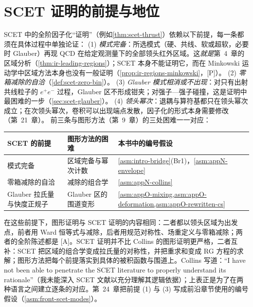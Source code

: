 \section{SCET 证明的前提与地位}\label{sec:scet-status}

\begin{remark}\label{rem:scet-assumptions}
SCET 中的全阶因子化“证明”（例如\cref{thm:scet-thrust}）依赖以下前提，每一条都须在具体过程中单独论证：
(1) \emph{模式完备}：所选模式（硬、共线、软或超软，必要时 Glauber）再现 QCD 在给定观测量下的全部领头红外区域。这\emph{就是}第~4~章的区域分析（\cref{thm:ir-leading-regions}）；SCET 本身不能证明它，而在 Minkowski 运动学中区域方法本身也没有一般证明（\cref{prop:ir-regions-minkowski}，[P]）。
(2) \emph{零箱减除的自洽}（\cref{def:scet-zero-bin}）。
(3) \emph{Glauber 模式相消或不出现}：对只有出射共线粒子的 $e^+e^-$ 过程，Glauber 区不形成钳夹；对强子—强子碰撞，这是证明中最困难的一步（\cref{sec:scet-glauber}）。
(4) \emph{领头幂次}：退耦与算符基都只在领头幂次成立；在次领头幂次，卷积可以出现端点发散，因子化的形式本身需要修改（第~21~章）。
前三条与图形方法（第~9~章）的三处困难一一对应：
\begin{center}\small
\renewcommand{\arraystretch}{1.1}
\begin{tabular}{@{}lll@{}}
\toprule
SCET 的前提 & 图形方法的困难 & 本书中的编号假设 \\
\midrule
模式完备 & 区域完备与幂次计数 & \cref{asm:intro-bridge}(Br1)，\cref{asm:appN-envelope} \\
零箱减除的自洽 & 减除的组合学 & \cref{asm:appN-collins} \\
Glauber 拉氏量与快度正规子 & Glauber 区的围道变形 & \cref{asm:appO-mixing,asm:appO-deformation,asm:appO-rewritten-cs} \\
\bottomrule
\end{tabular}
\end{center}
在这些前提下，图形证明与 SCET 证明的内容相同：二者都以领头区域为出发点，前者用 Ward 恒等式与减除，后者用规范对称性、场重定义与零箱减除；两者的全阶陈述都是 [A]。SCET 证明并不比 Collins 的图形证明更严格，二者互补：SCET 把区域的组合学变成拉氏量的对称性，并把重求和变成 RG 方程的求解；图形方法把每个前提落实到具体的被积函数与围道上。Collins 写道：“I have not been able to penetrate the SCET literature to properly understand its rationale”（我未能深入 SCET 文献以充分理解其逻辑依据）\cite[第~15.9~节]{Collins2011}；上表正是为了在两种语言之间建立逐条的对应。第~24~章把前提 (1) 与 (3) 写成前沿章节使用的编号假设（\cref{asm:front-scet-modes}）。
\end{remark}


